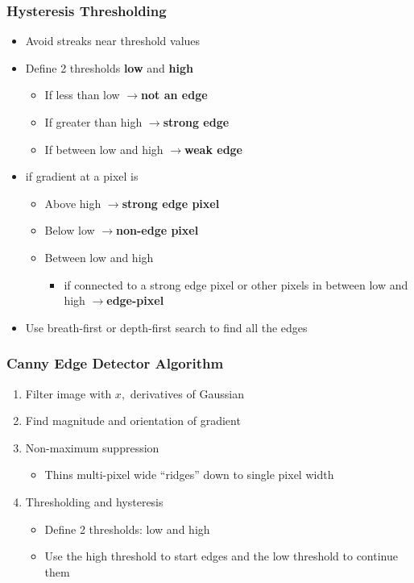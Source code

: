 \documentclass[letterpaper,12pt]{article}
\newcommand{\lra}{\ensuremath{\longrightarrow{}}}
\begin{document}
\subsubsection{Hysteresis Thresholding}
\begin{itemize}
 \item Avoid streaks near threshold values
 \item Define 2 thresholds \textbf{low} and \textbf{high}
       \begin{itemize}
        \item If less than low \lra \textbf{not an edge}
        \item If greater than high \lra \textbf{strong edge}
        \item If between low and high \lra \textbf{weak edge}
       \end{itemize}
\end{itemize}
\begin{itemize}
 \item if gradient at a pixel is
       \begin{itemize}
        \item Above high \lra \textbf{strong edge pixel}
        \item Below low \lra \textbf{non-edge pixel}
        \item Between low and high
              \begin{itemize}
               \item if connected to a strong edge pixel or other pixels in between low and high \lra \textbf{edge-pixel}
              \end{itemize}
       \end{itemize}
 \item Use breath-first or depth-first search to find all the edges
\end{itemize}

\subsubsection{Canny Edge Detector Algorithm}
\begin{enumerate}
 \item Filter image with $x,$ derivatives of Gaussian
 \item Find magnitude and orientation of gradient
 \item Non-maximum suppression
       \begin{itemize}
        \item Thins multi-pixel wide ``ridges'' down to single pixel width
       \end{itemize}
 \item Thresholding and hysteresis
       \begin{itemize}
        \item Define 2 thresholds: low and high
        \item Use the high threshold to start edges and the low threshold to continue them
       \end{itemize}
\end{enumerate}
\end{document}
